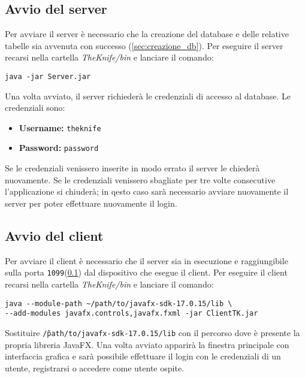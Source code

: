 \subsection{Avvio del server}
\label{sec:avvio_server}
Per avviare il server è necessario che la creazione del database 
e delle relative tabelle sia avvenuta con successo 
(\ref{sec:creazione_db}).
Per eseguire il server recarsi nella cartella \textit{TheKnife/bin} 
e lanciare il comando:
\begin{verbatim}
java -jar Server.jar
\end{verbatim}
Una volta avviato, il server richiederà le credenziali di accesso al database.
Le credenziali sono:
\begin{itemize}
    \item \textbf{Username:} \texttt{theknife}
    \item \textbf{Password:} \texttt{password}
\end{itemize}
Se le credenziali venissero inserite in modo errato il server le 
chiederà nuovamente. Se le credenziali venissero sbagliate per tre volte 
consecutive l'applicazione si chiuderà; in qesto caso sarà necessario 
avviare nuovamente il server per poter effettuare nuovamente il login.

\subsection{Avvio del client}
\label{sec:avvio_client}
Per avviare il client è necessario che il server sia in esecuzione
e raggiungibile sulla porta \texttt{1099}(\ref{sec:avvio_server}) dal dispositivo che 
esegue il client.
Per eseguire il client recarsi nella cartella \textit{TheKnife/bin} 
e lanciare il comando:
\begin{verbatim}
java --module-path ~/path/to/javafx-sdk-17.0.15/lib \
--add-modules javafx.controls,javafx.fxml -jar ClientTK.jar
\end{verbatim}
Sostituire \texttt{\~/path/to/javafx-sdk-17.0.15/lib} con 
il percorso dove è presente la propria libreria JavaFX.
Una volta avviato apparirà la finestra principale con interfaccia grafica
e sarà possibile effettuare il login con le credenziali di un utente, 
registrarsi o accedere come utente ospite.
